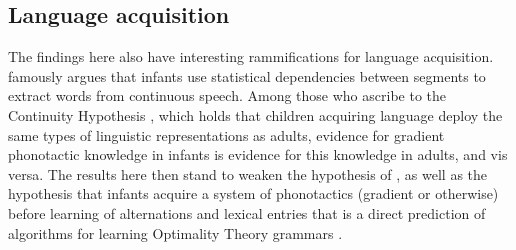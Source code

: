 \subsection{Language acquisition}

The findings here also have interesting rammifications for language acquisition. \citet{Saffran1996} famously argues that infants use statistical dependencies between segments to extract words from continuous speech. Among those who ascribe to the Continuity Hypothesis \citep[e.g.,][]{Macnamara1982,Pinker1984,Crain1991,Carey1995,deVilliers2001,Legate2007}, which holds that children acquiring language deploy the same types of linguistic representations as adults, evidence for gradient phonotactic knowledge in infants is evidence for this knowledge in adults, and vis versa. The results here then stand to weaken the hypothesis of \citeauthor{Saffran1996}, as well as the hypothesis that infants acquire a system of phonotactics (gradient or otherwise) before learning of alternations and lexical entries that is a direct prediction of algorithms for learning Optimality Theory grammars \citep{Tesar2004,Hayes2004b}. 


